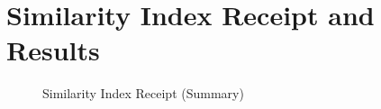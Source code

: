 \chapter{Similarity Index Receipt and Results}
\begin{figure}[h]
    \centering
    \setlength{\fboxsep}{0pt}
    \caption{Similarity Index Receipt (Summary)}
    \label{fig:myfig84}
\end{figure}
\clearpage
